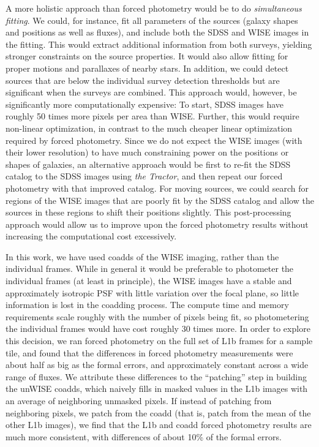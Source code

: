 \documentclass[12pt,preprint]{aastex}
\newcommand{\thetractor}{\textsl{the Tractor}}
\begin{document}
A more holistic approach than forced photometry would be to do
\emph{simultaneous fitting}.  We could, for instance, fit all
parameters of the sources (galaxy shapes and positions as well as
fluxes), and include both the SDSS and WISE images in the fitting.
This would extract additional information from both surveys, yielding
stronger constraints on the source properties.  It would also allow
fitting for proper motions and parallaxes of nearby stars.  In
addition, we could detect sources that are below the individual survey
detection thresholds but are significant when the surveys are
combined.  This approach would, however, be significantly more
computationally expensive: To start, SDSS images have roughly 50 times
more pixels per area than WISE.  Further, this would require
non-linear optimization, in contrast to the much cheaper linear
optimization required by forced photometry.  Since we do not expect
the WISE images (with their lower resolution) to have much
constraining power on the positions or shapes of galaxies, an
alternative approach would be first to re-fit the SDSS catalog to the
SDSS images using \thetractor, and then repeat our forced photometry
with that improved catalog.  For moving sources, we could search for
regions of the WISE images that are poorly fit by the SDSS catalog and
allow the sources in these regions to shift their positions slightly.
This post-processing approach would allow us to improve upon the
forced photometry results without increasing the computational cost
excessively.


In this work, we have used coadds of the WISE imaging, rather than the
individual frames.  While in general it would be preferable to
photometer the individual frames (at least in principle), the WISE
images have a stable and approximately isotropic PSF with little
variation over the focal plane, so little information is lost in the
coadding process.  The compute time and memory requirements
scale roughly with the number of pixels being fit, so photometering
the individual frames would have cost roughly 30 times more.
%
In order to explore this decision, we ran forced photometry on the
full set of L1b frames for a sample tile, and found that the
differences in forced photometry measurements were about half as big
as the formal errors, and approximately constant across a wide range
of fluxes.  We attribute these differences to the ``patching'' step in
building the unWISE coadds, which naively fills in masked values in
the L1b images with an average of neighboring unmasked pixels.  If
instead of patching from neighboring pixels, we patch from the coadd
(that is, patch from the mean of the other L1b images), we find that
the L1b and coadd forced photometry results are much more consistent,
with differences of about 10\% of the formal errors.
\end{document}
